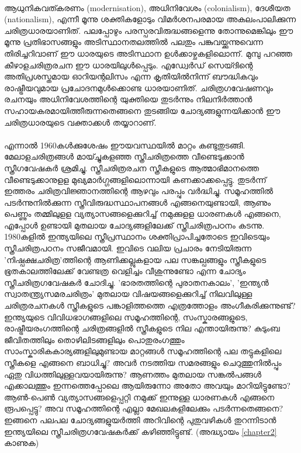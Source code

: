 \label{ch1box6} %
\begin{tcolorbox}[%
  breakable, %
  arc=0mm, 
  left=1pt, right = 1pt, 
  boxrule=0mm,
  colback = {blue!10}, %
] 
{\paragraph{}ആധുനികവത്കരണം (modernisation), അധിനിവേശം (colonialism), ദേശീയത (nationalism), എന്നീ മൂന്നു ശക്തികളോടും വിമർശനപരമായ അകലംപാലിക്കുന്ന ചരിത്രധാരയാണിത്. പലപ്പോഴും പരസ്പരവിരുദ്ധങ്ങളെന്നു തോന്നുമെങ്കിലും ഈ മൂന്നു പ്രതിഭാസങ്ങളും അടിസ്ഥാനതലത്തിൽ പലതും പങ്കുവയ്ക്കുന്നുവെന്ന തിരിച്ചറിവാണ് ഈ ധാരയുടെ അടിസ്ഥാന ഉൾക്കാഴ്ചകളിലൊന്ന്. മുമ്പു പറഞ്ഞ കീഴാളചരിത്രരചന ഈ ധാരയിലുൾപ്പെടും. എഡ്വേർഡ് സെയ്ദിന്റെ അതിപ്രശസ്തമായ ഓറിയന്റലിസം എന്ന കൃതിയിൽനിന്ന് ബൗദ്ധികവും രാഷ്ട്രീയവുമായ പ്രചോദനമുൾക്കൊണ്ട ധാരയാണിത്. ചരിത്രഗവേഷണവും രചനയും അധിനിവേശത്തിന്റെ യുക്തിയെ തുടർന്നും നിലനിർത്താൻ സഹായകരമായിത്തീരുന്നതെങ്ങനെ തുടങ്ങിയ ചോദ്യങ്ങളുന്നയിക്കാൻ ഈ ചരിത്രധാരയുടെ വക്താക്കൾ തയ്യാറാണ്.}
\end{tcolorbox}

\paragraph{}	എന്നാൽ 1960കൾക്കുശേഷം ഈയവസ്ഥയിൽ മാറ്റം കണ്ടുതുടങ്ങി. മേലാളചരിത്രങ്ങൾ മായ്ച്ചുകളഞ്ഞ സ്ത്രീചരിത്രത്തെ വീണ്ടെടുക്കാൻ സ്ത്രീഗവേഷകർ ശ്രമിച്ചു. സ്ത്രീചരിത്രരചന സ്ത്രീകളുടെ ആത്മാഭിമാനത്തെ വീണ്ടെടുക്കാനുളള മുഖ്യമാർഗ്ഗങ്ങളിലൊന്നായി കണക്കാക്കപ്പെട്ടു. തുടർന്ന് ഇത്തരം ചരിത്രവിജ്ഞാനത്തിന്റെ ആഴവും പരപ്പും വർദ്ധിച്ചു. സമൂഹത്തിൽ പടർന്നുനിൽക്കുന്ന സ്ത്രീവിരുദ്ധസ്ഥാപനങ്ങൾ എങ്ങനെയുണ്ടായി, ആണും പെണ്ണും തമ്മിലുളള വ്യത്യാസങ്ങളെക്കുറിച്ച് നമുക്കുളള ധാരണകൾ എങ്ങനെ, എപ്പോൾ ഉണ്ടായി മുതലായ ചോദ്യങ്ങളിലേക്ക് സ്ത്രീചരിത്രപഠനം കടന്നു.
1980കളിൽ ഇന്ത്യയിലെ സ്ത്രീപ്രസ്ഥാനം ശക്തിപ്രാപിച്ചതോടെ ഇവിടെയും സ്ത്രീചരിത്രപഠനം സജീവമായി. ഇവിടെ വലിയ പ്രചാരം നേടിയിരുന്ന 'നിഷ്പക്ഷചരിത്ര'ത്തിന്റെ ആണിക്കല്ലുകളായ പല സങ്കല്പങ്ങളും സ്ത്രീകളുടെ ഭൂതകാലത്തിലേക്ക് വേണ്ടത്ര വെളിച്ചം വീശുന്നുണ്ടോ എന്ന ചോദ്യം സ്ത്രീചരിത്രഗവേഷകർ ചോദിച്ചു. 'ഭാരതത്തിന്റെ പുരാതനകാലം', 'ഇന്ത്യൻ സ്വാതന്ത്ര്യസമരചരിത്രം' മുതലായ വിഷയങ്ങളെക്കുറിച്ച് നിലവിലുള്ള ചരിത്രരചനകൾ സ്ത്രീകളുടെ പങ്കാളിത്തത്തെ എത്രത്തോളം അംഗീകരിക്കുന്നുണ്ട്? ഇന്ത്യയുടെ വിവിധഭാഗങ്ങളിലെ സമൂഹത്തിന്റെ, സംസ്കാരങ്ങളുടെ, രാഷ്ട്രീയരംഗത്തിന്റെ ചരിത്രങ്ങളിൽ സ്ത്രീകളുടെ നില എന്തായിരുന്നു? കുടുംബ ജീവിതത്തിലും തൊഴിലിടങ്ങളിലും പൊതുരംഗത്തും സാംസ്കാരികകാര്യങ്ങളിലുമുണ്ടായ മാറ്റങ്ങൾ സമൂഹത്തിന്റെ പല തട്ടുകളിലെ സ്ത്രീകളെ എങ്ങനെ ബാധിച്ചു? അവർ നടത്തിയ സമരങ്ങളും ചെറുത്തുനിൽപ്പും ഏതു വിധത്തിലുള്ളവയായിരുന്നു? ആണത്തം മുതലായ സങ്കൽപങ്ങൾ എക്കാലത്തും ഇന്നത്തെപ്പോലെ ആയിരുന്നോ അതോ അവയും മാറിയിട്ടുണ്ടോ? ആൺ-പെൺ വ്യത്യാസങ്ങളെപ്പറ്റി നമുക്ക് ഇന്നുള്ള ധാരണകൾ എങ്ങനെ രൂപപ്പെട്ടു? അവ സമൂഹത്തിന്റെ എല്ലാ മേഖലകളിലേക്കും പടർന്നതെങ്ങനെ? ഇങ്ങനെ പലപല ചോദ്യങ്ങളുയർത്തി അറിവിന്റെ പുതുവഴികൾ തുറന്നിടാൻ ഇന്ത്യയിലെ സ്ത്രീചരിത്രഗവേഷകർക്ക് കഴിഞ്ഞിട്ടുണ്ട്. (അദ്ധ്യായം \ref{chapter2} കാണുക)

